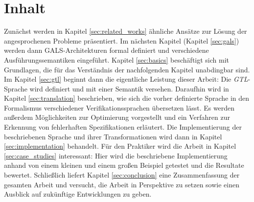 \section{Inhalt}
Zunächst werden in Kapitel \ref{sec:related_works} ähnliche Ansätze zur Lösung der angesprochenen Probleme präsentiert.
Im nächsten Kapitel (Kapitel \ref{sec:gals}) werden dann GALS-Architekturen formal definiert und verschiedene Ausführungssemantiken eingeführt.
Kapitel \ref{sec:basics} beschäftigt sich mit Grundlagen, die für das Verständnis der nachfolgenden Kapitel unabdingbar sind.
Im Kapitel \ref{sec:gtl} beginnt dann die eigentliche Leistung dieser Arbeit: Die \emph{GTL}-Sprache wird definiert und mit einer Semantik versehen.
Daraufhin wird in Kapitel \ref{sec:translation} beschrieben, wie sich die vorher definierte Sprache in den Formalismus verschiedener Verifikationssprachen übersetzen lässt.
Es werden außerdem Möglichkeiten zur Optimierung vorgestellt und ein Verfahren zur Erkennung von fehlerhaften Spezifikationen erläutert.
Die Implementierung der beschriebenen Sprache und ihrer Transformationen wird dann in Kapitel \ref{sec:implementation} behandelt.
Für den Praktiker wird die Arbeit in Kapitel \ref{sec:case_studies} interessant:
Hier wird die beschriebene Implementierung anhand von einem kleinen und einem großen Beispiel getestet und die Resultate bewertet.
Schließlich liefert Kapitel \ref{sec:conclusion} eine Zusammenfassung der gesamten Arbeit und versucht, die Arbeit in Perspektive zu setzen sowie einen Ausblick auf zukünftige Entwicklungen zu geben.
